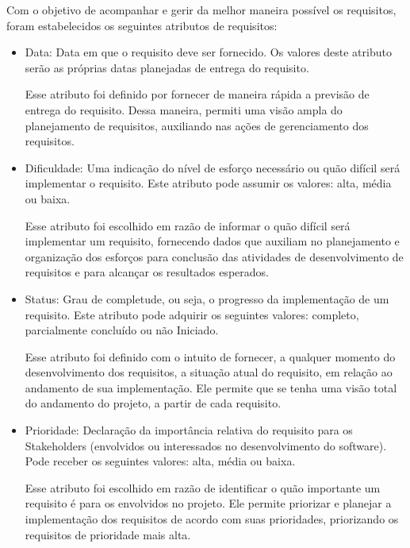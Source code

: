 Com o objetivo de acompanhar e gerir da melhor maneira possível os requisitos, foram estabelecidos os seguintes atributos de requisitos:
\begin{itemize}
\item Data:
Data em que o requisito deve ser fornecido. Os valores deste atributo serão as próprias datas planejadas de entrega do requisito.

Esse atributo foi definido por fornecer de maneira rápida a previsão de entrega do requisito. Dessa maneira, permiti uma visão ampla do planejamento de requisitos, auxiliando nas ações de gerenciamento dos requisitos.
\item Dificuldade:
Uma indicação do nível de esforço necessário ou quão difícil será implementar o requisito. Este atributo pode assumir os valores: alta, média ou baixa.

Esse atributo foi escolhido em razão de informar o quão difícil será implementar um requisito, fornecendo dados que auxiliam no planejamento e organização dos esforços para conclusão das atividades de desenvolvimento de requisitos e para alcançar os resultados esperados.

\item Status:
Grau de completude, ou seja, o progresso da implementação de um requisito. Este atributo pode adquirir os seguintes valores: completo, parcialmente concluído ou não Iniciado.

Esse atributo foi definido com o intuito de fornecer, a qualquer momento do desenvolvimento dos requisitos, a situação atual do requisito, em relação ao andamento de sua implementação. Ele permite que se tenha uma visão total do andamento do projeto, a partir de cada requisito.

\item Prioridade:
Declaração da importância relativa do requisito para os Stakeholders (envolvidos ou interessados no desenvolvimento do software). Pode receber os seguintes valores: alta, média ou baixa.

Esse atributo foi escolhido em razão de identificar o quão importante um requisito é para os envolvidos no projeto. Ele permite priorizar e planejar a implementação dos requisitos de acordo com suas prioridades, priorizando os requisitos de prioridade mais alta.


\end{itemize}

